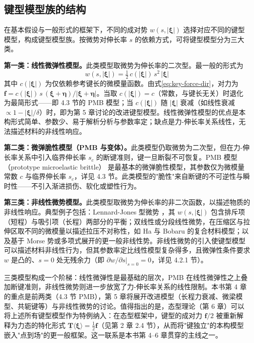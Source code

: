 \subsection{键型模型族的结构}

在基本假设与一般形式的框架下，不同的成对势 $w(s,|\boldsymbol{\xi}|)$ 选择对应不同的键型模型，构成键型模型族。按微势对伸长率 $s$ 的依赖方式，可将键型模型分为三大类。

\textbf{第一类：线性微弹性模型。}此类模型取微势为伸长率的二次型。最一般的形式为
\begin{equation}
w(s,|\boldsymbol{\xi}|) = \tfrac{1}{2}\,c(|\boldsymbol{\xi}|)\,s^{2}\,|\boldsymbol{\xi}|
\label{eq:linear-micro-potential}
\end{equation}
其中 $c(|\boldsymbol{\xi}|)$ 为仅依赖参考键长的微模量函数。由式\eqref{eq:key-force-dir}，对力为 $\mathbf{f}=c(|\boldsymbol{\xi}|)\,s\,(\boldsymbol{\xi}+\boldsymbol{\eta})/|\boldsymbol{\xi}+\boldsymbol{\eta}|$。当取 $c(|\boldsymbol{\xi}|)=c$（常数，与键长无关）时退化为最简形式——即 4.3 节的 PMB 模型；当 $c(|\boldsymbol{\xi}|)$ 随 $|\boldsymbol{\xi}|$ 衰减（如线性衰减 $\propto 1-|\boldsymbol{\xi}|/\delta$）时，即为第 5 章讨论的改进键型模型。线性微弹性模型的优点是本构形式简单、参数少、易于解析分析与参数率定；缺点是力-伸长率关系线性，无法描述材料的非线性响应。

\textbf{第二类：微弹脆性模型（PMB 与变体）。}此类模型仍取微势为二次型，但在力-伸长率关系中引入临界伸长率 $s_c$ 的断键准则，键一旦断裂不可恢复。PMB 模型（prototype microelastic brittle）\cite{SillingAskari2005} 是最基本的微弹脆性模型，其参数仅为微模量常数 $c$ 与临界伸长率 $s_c$，详见 4.3 节。此类模型的"脆性"来自断键的不可逆性与瞬时性——不引入渐进损伤、软化或塑性行为。

\textbf{第三类：非线性微势模型。}此类模型取微势为伸长率的非二次函数，以描述物质的非线性响应。典型例子包括：Lennard-Jones 型微势 \cite{SillingZimmermannAbeyaratne2003}，其 $w(s,|\boldsymbol{\xi}|)$ 包含排斥项（短程）与吸引项（长程）两部分的平衡；双线性或分段线性微势，在压缩区与拉伸区取不同的微模量以描述拉压不对称性，如 Ha 与 Bobaru \cite{HaBobaru2010} 的复合材料模型；以及基于 Morse 势或多项式展开的更一般非线性势。非线性微势的引入使键型模型可以描述材料非线性行为，但其参数率定比线性模型复杂得多，且微弹性条件要求 $w$ 是凸的、$s=0$ 处无残余力（即 $\partial w/\partial s|_{s=0}=0$，详见 4.2.1 节）。

三类模型构成一个阶梯：线性微弹性是最基础的层次，PMB 在线性微弹性之上叠加断键准则，非线性微势则进一步放宽了力-伸长率关系的线性限制。本书第 4 章的重点是前两类（4.3 节 PMB），第 5 章将展开改进模型（长程力衰减、微梁模型、共轭键等）与非线性微势的讨论。值得指出的是，态型理论（第 6 章）可以将上述所有键型模型作为特例纳入：在态型框架中，键型的成对力 $\mathbf{f}/2$ 被重新解释为力态的特化形式 $\underline{\mathbf{T}}\langle\boldsymbol{\xi}\rangle=\tfrac{1}{2}\mathbf{f}$（见第 2 章 2.4 节），从而将"键独立"的本构模型嵌入"点到场"的更一般框架。这一联系是本书第 4--6 章贯穿的主线之一。

